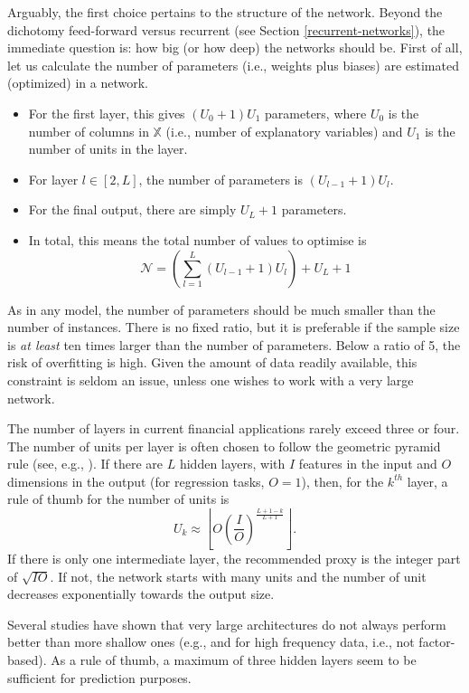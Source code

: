 \documentclass[]{krantz}
\providecommand{\tightlist}{%
  \setlength{\itemsep}{0pt}\setlength{\parskip}{0pt}}
\theoremstyle{definition}
\theoremstyle{definition}
\theoremstyle{definition}
\theoremstyle{remark}
\begin{document}
Arguably, the first choice pertains to the structure of the network.
Beyond the dichotomy feed-forward versus recurrent (see Section
\ref{recurrent-networks}), the immediate question is: how big (or how
deep) the networks should be. First of all, let us calculate the number
of parameters (i.e., weights plus biases) are estimated (optimized) in a
network.

\begin{itemize}
\tightlist
\item
  For the first layer, this gives \((U_0+1)U_1\) parameters, where
  \(U_0\) is the number of columns in \(\mathbb{X}\) (i.e., number of
  explanatory variables) and \(U_1\) is the number of units in the
  layer.\\
\item
  For layer \(l\in[2,L]\), the number of parameters is
  \((U_{l-1}+1)U_l\).\\
\item
  For the final output, there are simply \(U_L+1\) parameters.\\
\item
  In total, this means the total number of values to optimise is
  \[\mathcal{N}=\left(\sum_{l=1}^L(U_{l-1}+1)U_l\right)+U_L+1\]
\end{itemize}

As in any model, the number of parameters should be much smaller than
the number of instances. There is no fixed ratio, but it is preferable
if the sample size is \emph{at least} ten times larger than the number
of parameters. Below a ratio of 5, the risk of overfitting is high.
Given the amount of data readily available, this constraint is seldom an
issue, unless one wishes to work with a very large network.

The number of layers in current financial applications rarely exceed
three or four. The number of units per layer is often chosen to follow
the geometric pyramid rule (see, e.g., \citet{masters1993practical}). If
there are \(L\) hidden layers, with \(I\) features in the input and
\(O\) dimensions in the output (for regression tasks, \(O=1\)), then,
for the \(k^{th}\) layer, a rule of thumb for the number of units is
\[U_k\approx \left\lfloor O\left( \frac{I}{O}\right)^{\frac{L+1-k}{L+1}}\right\rfloor.\]
If there is only one intermediate layer, the recommended proxy is the
integer part of \(\sqrt{IO}\). If not, the network starts with many
units and the number of unit decreases exponentially towards the output
size.

Several studies have shown that very large architectures do not always
perform better than more shallow ones (e.g., \citet{gu2018empirical} and
\citet{orimoloye2019comparing} for high frequency data, i.e., not
factor-based). As a rule of thumb, a maximum of three hidden layers seem
to be sufficient for prediction purposes.
\end{document}
